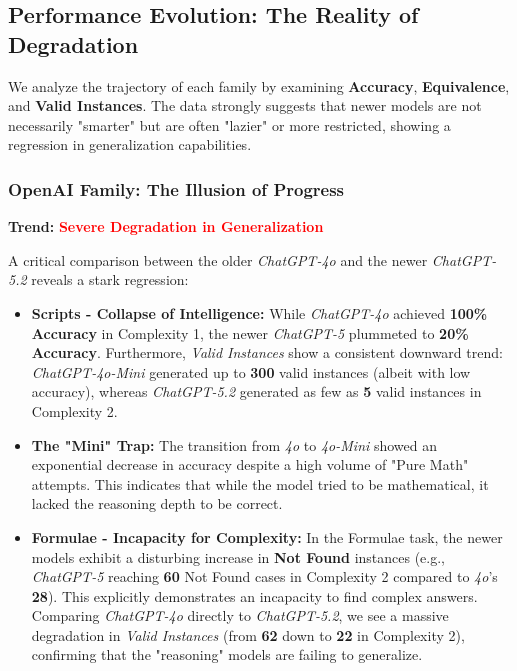 \subsection{Performance Evolution: The Reality of Degradation}
We analyze the trajectory of each family by examining \textbf{Accuracy}, \textbf{Equivalence}, and \textbf{Valid Instances}. The data strongly suggests that newer models are not necessarily "smarter" but are often "lazier" or more restricted, showing a regression in generalization capabilities.

\subsubsection{OpenAI Family: The Illusion of Progress}
\textbf{Trend:} \textcolor{red}{\textbf{Severe Degradation in Generalization}}

A critical comparison between the older \textit{ChatGPT-4o} \cite{OpenAI2024GPT4o} and the newer \textit{ChatGPT-5.2} \cite{OpenAI2025GPT5} reveals a stark regression:

\begin{itemize}
    \item \textbf{Scripts - Collapse of Intelligence:} 
    While \textit{ChatGPT-4o} achieved \textbf{100\% Accuracy} in Complexity 1, the newer \textit{ChatGPT-5} plummeted to \textbf{20\% Accuracy}. Furthermore, \textit{Valid Instances} show a consistent downward trend: \textit{ChatGPT-4o-Mini} generated up to \textbf{300} valid instances (albeit with low accuracy), whereas \textit{ChatGPT-5.2} generated as few as \textbf{5} valid instances in Complexity 2.
    
    \item \textbf{The "Mini" Trap:} 
    The transition from \textit{4o} to \textit{4o-Mini} showed an exponential decrease in accuracy despite a high volume of "Pure Math" attempts. This indicates that while the model tried to be mathematical, it lacked the reasoning depth to be correct.
    
    \item \textbf{Formulae - Incapacity for Complexity:} 
    In the Formulae task, the newer models exhibit a disturbing increase in \textbf{Not Found} instances (e.g., \textit{ChatGPT-5} reaching \textbf{60} Not Found cases in Complexity 2 compared to \textit{4o}'s \textbf{28}). This explicitly demonstrates an incapacity to find complex answers. Comparing \textit{ChatGPT-4o} directly to \textit{ChatGPT-5.2}, we see a massive degradation in \textit{Valid Instances} (from \textbf{62} down to \textbf{22} in Complexity 2), confirming that the "reasoning" models are failing to generalize.
\end{itemize}

